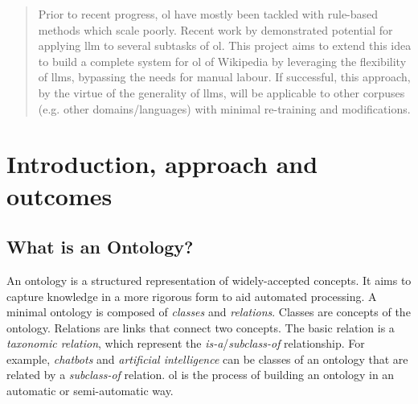 
\begin{abstract}
    \noindent Prior to recent progress, \gls{ol} have mostly been tackled with rule-based methods which scale poorly. Recent work by \citet{llms4ol} demonstrated potential for applying \gls{llm} to several subtasks of \gls{ol}. This project aims to extend this idea to build a complete system for \gls{ol} of Wikipedia by leveraging the flexibility of \gls{llm}s, bypassing the needs for manual labour. If successful, this approach, by the virtue of the generality of \gls{llm}s, will be applicable to other corpuses (e.g. other domains/languages) with minimal re-training and modifications.
\end{abstract}

\section*{Introduction, approach and outcomes}



\subsection*{What is an Ontology?}

An ontology is a structured representation of widely-accepted concepts. It aims to capture knowledge in a more rigorous form to aid automated processing. A minimal ontology is composed of \emph{classes} and \emph{relations}. Classes are concepts of the ontology. Relations are links that connect two concepts. The basic relation is a \emph{taxonomic relation}, which represent the \emph{is-a}/\emph{subclass-of} relationship. For example, \emph{chatbots} and \emph{artificial intelligence} can be classes of an ontology that are related by a \emph{subclass-of} relation. \gls{ol} is the process of building an ontology in an automatic or semi-automatic way.

